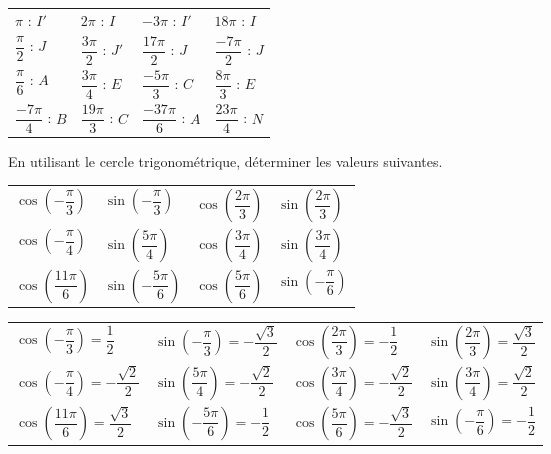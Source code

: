 \documentclass[11pt,fleqn, openany]{book} %
\begin{document}
\begin{solution}

\renewcommand{\arraystretch}{2}\begin{tabularx}{\linewidth}{XXXX}
$\pi$ : $I'$ & $2\pi$ : $I$ & $-3\pi$ : $I'$ & $18\pi$ : $I$ \\
$\dfrac{\pi}{2}$ : $J$& $\dfrac{3\pi}{2}$ : $J'$ & $\dfrac{17\pi}{2}$ : $J$ & $\dfrac{-7\pi}{2}$ : $J$\\
$\dfrac{\pi}{6}$ : $A$& $\dfrac{3\pi}{4}$ : $E$ & $\dfrac{-5\pi}{3}$ : $C$ & $\dfrac{8\pi}{3}$ : $E$\\
$\dfrac{-7\pi}{4}$ : $B$ & $\dfrac{19\pi}{3}$ : $C$ & $\dfrac{-37\pi}{6}$ : $A$ & $\dfrac{23\pi}{4}$ : $N$\end{tabularx}

\end{solution}



\begin{exercise}[topic=trig01] En utilisant le cercle trigonométrique, déterminer les valeurs suivantes.

\begin{tabularx}{\linewidth}{XXXX}
$\cos \left( -\dfrac{\pi}{3} \right)$ & $\sin \left(- \dfrac{\pi}{3} \right)$ & $\cos \left( \dfrac{2\pi}{3} \right)$ & $\sin \left( \dfrac{2\pi}{3} \right)$ \\
$\cos \left( -\dfrac{\pi}{4} \right)$ & $\sin \left( \dfrac{5\pi}{4} \right)$ & $\cos \left( \dfrac{3\pi}{4} \right)$ & $\sin \left( \dfrac{3\pi}{4} \right)$ \\
$\cos \left( \dfrac{11\pi}{6} \right)$ & $\sin \left(- \dfrac{5\pi}{6} \right)$ & $\cos \left( \dfrac{5\pi}{6} \right)$ & $\sin \left( -\dfrac{\pi}{6} \right)$ 
\end{tabularx}\end{exercise}


\begin{solution}

\begin{tabularx}{\linewidth}{XXXX}
$\cos \left( -\dfrac{\pi}{3} \right) = \dfrac{1}{2}$ & $\sin \left(- \dfrac{\pi}{3} \right)=-\dfrac{\sqrt{3}}{2}$ & $\cos \left( \dfrac{2\pi}{3} \right) = -\dfrac{1}{2}$ & $\sin \left( \dfrac{2\pi}{3} \right) = \dfrac{\sqrt{3}}{2}$ \\
$\cos \left( -\dfrac{\pi}{4} \right) = -\dfrac{\sqrt{2}}{2}$ & $\sin \left( \dfrac{5\pi}{4} \right)=-\dfrac{\sqrt{2}}{2}$ & $\cos \left( \dfrac{3\pi}{4} \right)=-\dfrac{\sqrt{2}}{2}$ & $\sin \left( \dfrac{3\pi}{4} \right) = \dfrac{\sqrt{2}}{2}$ \\
$\cos \left( \dfrac{11\pi}{6} \right)=\dfrac{\sqrt{3}}{2}$ & $\sin \left(- \dfrac{5\pi}{6} \right)=-\dfrac{1}{2}$ & $\cos \left( \dfrac{5\pi}{6} \right)=-\dfrac{\sqrt{3}}{2}$ & $\sin \left( -\dfrac{\pi}{6} \right)=-\dfrac{1}{2}$ 
\end{tabularx}\end{solution}
\end{document}
